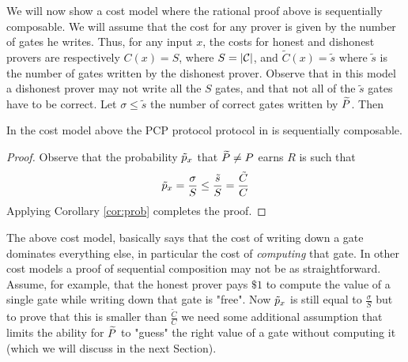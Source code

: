 We will now show  a cost model where the rational proof above is sequentially 
composable.
We will assume that the cost for any prover is given by the number of gates he 
writes. Thus, for any input 
$x$, the costs for honest and dishonest provers are 
respectively $C(x) = S$, where $S = |\cal C|$, and $\tilde{C}(x) = \tilde{s}$ 
where $\tilde s$ is the number of gates written by the dishonest prover.
Observe that in this model a dishonest prover may not write all the $S$ 
gates, and that not all of the $\tilde{s}$ gates have to be correct. Let $\sigma \leq \tilde{s}$ the number of correct gates written by $\widetilde{P}$. Then 

\begin{mythm}
In the cost model above the PCP protocol protocol in \cite{am1} is sequentially 
composable.
\end{mythm}
\begin{proof}
Observe that the probability $\tilde{p}_x$ that $\widetilde{P}\neq P$ earns $R$ is such that
$$ \tilde{p}_x = \frac{\sigma}{S} \leq \frac{\tilde s}{S} = \frac{\tilde C}{C} $$
Applying Corollary \ref{cor:prob} completes the proof.
\end{proof}

The above cost model, basically says that the cost of writing down a gate dominates everything else, in particular the cost of {\em computing} that gate. 
In other cost models a proof of sequential composition may not 
be as straightforward. Assume, for example, that the honest prover pays $\$1$ to
compute the value of a single gate while writing down that gate is "free". Now $\tilde{p}_x$ is still equal to $\frac{\sigma}{S}$ but to 
prove that this is smaller than $\frac{\tilde C}{C}$ we need some additional assumption that limits the ability for $\widetilde{P}$ to "guess" the 
right value of a gate without computing it (which we will discuss in the next Section). 


